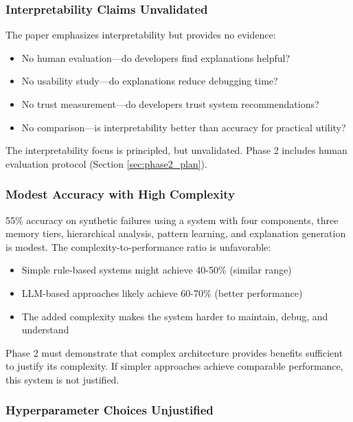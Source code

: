 \documentclass[11pt]{article}
\begin{document}
\subsubsection{Interpretability Claims Unvalidated}

The paper emphasizes interpretability but provides no evidence:

\begin{itemize}
    \item No human evaluation—do developers find explanations helpful?
    \item No usability study—do explanations reduce debugging time?
    \item No trust measurement—do developers trust system recommendations?
    \item No comparison—is interpretability better than accuracy for practical utility?
\end{itemize}

The interpretability focus is principled, but unvalidated. Phase 2 includes human evaluation protocol (Section \ref{sec:phase2_plan}).

\subsubsection{Modest Accuracy with High Complexity}

55\% accuracy on synthetic failures using a system with four components, three memory tiers, hierarchical analysis, pattern learning, and explanation generation is modest. The complexity-to-performance ratio is unfavorable:

\begin{itemize}
    \item Simple rule-based systems might achieve 40-50\% (similar range)
    \item LLM-based approaches likely achieve 60-70\% (better performance)
    \item The added complexity makes the system harder to maintain, debug, and understand
\end{itemize}

Phase 2 must demonstrate that complex architecture provides benefits sufficient to justify its complexity. If simpler approaches achieve comparable performance, this system is not justified.

\subsubsection{Hyperparameter Choices Unjustified}
\end{document}

